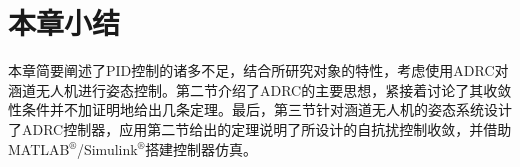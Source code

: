 \section{本章小结}
本章简要阐述了PID控制的诸多不足，结合所研究对象的特性，考虑使用ADRC对涵道无人机进行姿态控制。第二节介绍了ADRC的主要思想，紧接着讨论了其收敛性条件并不加证明地给出几条定理。最后，第三节针对涵道无人机的姿态系统设计了ADRC控制器，应用第二节给出的定理说明了所设计的自抗扰控制收敛，并借助MATLAB$^\circledR$/Simulink$^\circledR$搭建控制器仿真。








